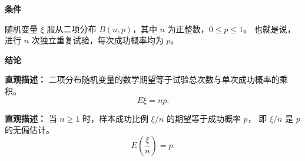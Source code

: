 \begin{statementbox}
	\textbf{\textcolor{CStatement}{条件}}
	\begin{description}[style=nextline, leftmargin=2.8em, labelsep=0.5em, itemsep=0.35em]
		\item[\textbf{\textcolor{CStatement}{条件1（二项分布）：}}]
		      随机变量 $\xi$ 服从二项分布 $B(n,p)$，其中 $n$ 为正整数，$0\le p\le 1$。
		      也就是说，进行 $n$ 次独立重复试验，每次成功概率均为 $p$。
	\end{description}

	\textbf{\textcolor{CStatement}{结论}}
	\begin{description}[style=nextline, leftmargin=2.8em, labelsep=0.5em, itemsep=0.45em]
		\item[\textbf{\textcolor{CStatement}{结论一（期望公式）：}}]
		      \textbf{\textcolor{CStatement}{直观描述：}} 二项分布随机变量的数学期望等于试验总次数与单次成功概率的乘积。
		      \[
			      E\xi = np .
		      \]

		\item[\textbf{\textcolor{CStatement}{推广结论（样本成功比例的期望）：}}]
		      \textbf{\textcolor{CStatement}{直观描述：}} 当 $n\ge 1$ 时，样本成功比例 $\xi/n$ 的期望等于成功概率 $p$，
		      即 $\xi/n$ 是 $p$ 的无偏估计。
		      \[
			      E\!\left(\frac{\xi}{n}\right) = p .
		      \]
	\end{description}
\end{statementbox}